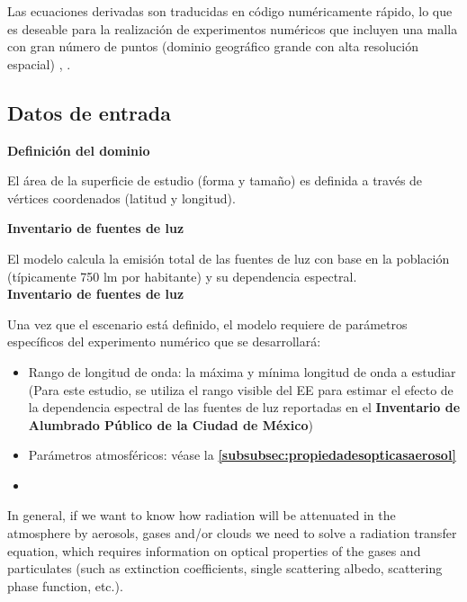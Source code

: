 Las ecuaciones derivadas son traducidas en código numéricamente rápido, lo que es deseable para la realización de experimentos numéricos que incluyen una malla con gran número de puntos (dominio geográfico grande con alta resolución espacial) \citep{Kocifaj2007}, \citep{Linares2018}.\\

\subsection{Datos de entrada}

\textbf{Definición del dominio}

El área de la superficie de estudio (forma y tamaño) es definida a través de vértices coordenados (latitud y longitud).\\

\newpage

\textbf{Inventario de fuentes de luz}

El modelo calcula la emisión total de las fuentes de luz con base en la población (típicamente 750 lm por habitante) y su dependencia espectral.\\

\textbf{Inventario de fuentes de luz}

Una vez que el escenario está definido, el modelo requiere de parámetros específicos del experimento numérico que se desarrollará:

\begin{itemize}

    \item Rango de longitud de onda: la máxima y mínima longitud de onda a estudiar (Para este estudio, se utiliza el rango visible del EE para estimar el efecto de la dependencia espectral de las fuentes de luz reportadas en el \textbf{Inventario de Alumbrado Público de la Ciudad de México})
    
    \item Parámetros atmosféricos: véase la \textbf{\autoref{subsubsec:propiedadesopticasaerosol}}
    
    \item 
    
\end{itemize}



In general, if we want to know how radiation will be attenuated in the
atmosphere by aerosols, gases and/or clouds we need to solve a radiation
transfer equation, which requires information on optical properties of the
gases and particulates (such as extinction coefficients, single scattering
albedo, scattering phase function, etc.). 


